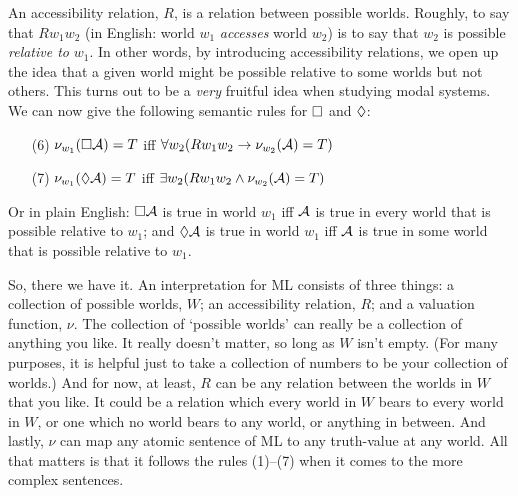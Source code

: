An accessibility relation, $R$, is a relation between possible worlds. Roughly, to say that $Rw_1w_2$ (in English: world $w_1$ \emph{accesses} world $w_2$) is to say that $w_2$ is possible \emph{relative to} $w_1$. In other words, by introducing accessibility relations, we open up the idea that a given world might be possible relative to some worlds but not others. This turns out to be a \emph{very} fruitful idea when studying modal systems. We can now give the following semantic rules for $\Box$ and $\Diamond$:
\begin{itemize}
	\item[(6)]$\nu_{w_1}(\Box \mathcal{A})=T$ iff $\forall w_2 (Rw_1w_2\rightarrow \nu_{w_2}(\mathcal{A})=T)$
	\item[(7)]$\nu_{w_1}(\Diamond \mathcal{A})=T$ iff $\exists w_2 (Rw_1w_2\wedge \nu_{w_2}(\mathcal{A})=T)$
\end{itemize}
Or in plain English: $\Box\mathcal{A}$ is true in world $w_1$ iff $\mathcal{A}$ is true in every world that is possible relative to $w_1$; and $\Diamond\mathcal{A}$ is true in world $w_1$ iff $\mathcal{A}$ is true in some world that is possible relative to $w_1$.

So, there we have it. An interpretation for ML consists of three things: a collection of possible worlds, $W$; an accessibility relation, $R$; and a valuation function, $\nu$. The collection of `possible worlds' can really be a collection of anything you like. It really doesn't matter, so long as $W$ isn't empty. (For many purposes, it is helpful just to take a collection of numbers to be your collection of worlds.) And for now, at least, $R$ can be any relation between the worlds in $W$ that you like. It could be a relation which every world in $W$ bears to every world in $W$, or one which no world bears to any world, or anything in between. And lastly, $\nu$ can map any atomic sentence of ML to any truth-value at any world. All that matters is that it follows the rules (1)--(7) when it comes to the more complex sentences.

